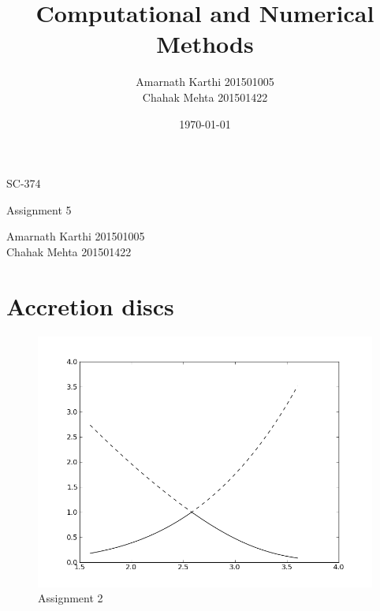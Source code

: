 \documentclass[12,a4paper]{article}
\title{Computational and Numerical Methods}
\date{\today}
\author{Amarnath Karthi  201501005 \\ Chahak Mehta  201501422}
\begin{document}
    \begin{titlepage}
	    \centering
	    {\scshape\LARGE SC-374 \par}
	    \vspace{0.1cm}
	    {\huge \@title \par}
	    \vspace{0.5cm}
	    {\Large Assignment 5\par}
	    \vspace{10cm}
	    \Large Amarnath Karthi          201501005\\
	    \Large Chahak Mehta             201501422\\
	    \vspace{5cm}
	    {\large \@date\par}
    \end{titlepage}
    
    \section{Accretion discs}
    
    \begin{figure}[H]
        \centering
        \includegraphics[width = \textwidth]{plots/accretion.png}
        \caption{Assignment 2}
        \label{fig:acc_disc}
    \end{figure}
    
\end{document}
